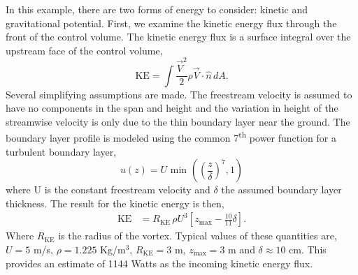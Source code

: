 In this example, there are two forms of energy to consider: kinetic and
gravitational potential. First, we examine the kinetic energy flux
through the front of the control volume. 
The kinetic energy flux is a surface integral over the upstream face of
the control volume,  
\begin{equation*}
\text{KE} = \int \frac{\vec V^2}{2} \rho \vec V \cdot \hat n \, dA.
\end{equation*}
%
%
Several simplifying assumptions are made. The freestream 
velocity is assumed to have no components in the span and height and
the variation in height of the streamwise
velocity is only due to the thin boundary layer near the
ground. The boundary layer profile is modeled using the common 
7\textsuperscript{th}
power function for a turbulent boundary layer,  
\begin{equation*}
  u(z) = U \text{ min }\left(\left(\frac{z}{\delta}\right)^7,1\right)
\end{equation*}
where U is the constant freestream velocity and $\delta$ the assumed
boundary layer thickness. 
The result for the kinetic energy is then, 
\begin{align}
\text{KE} & = R_{\text{KE}} \, \rho U^3 \left[ z_{\text{max}} - \frac{10}{11}\delta
\right]. \label{eq:kinetic_energy}
\end{align}
Where $R_{\text{KE}}$ is the radius of the vortex. Typical values of these quantities
are, $U = 5$ m/s, $\rho = 1.225$ Kg/$\text{m}^3$, $R_{\text{KE}} = 3$ m,
$z_{\text{max}} = 3$ m and $\delta \approx 10$ cm. This provides an
estimate of 1144 Watts as the incoming kinetic energy flux. 

